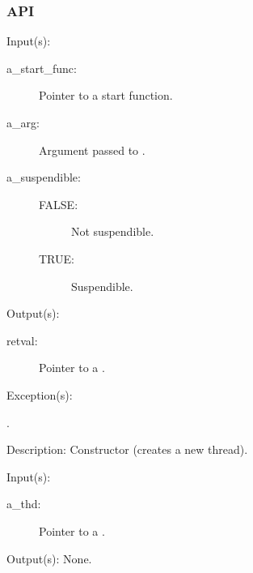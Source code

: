 \subsubsection{API}
\begin{capi}
\label{thd_new}
	\begin{capilist}
	\item[Input(s): ]
		\begin{description}\item[]
		\item[a\_start\_func: ] Pointer to a start function.
		\item[a\_arg: ] Argument passed to .
		\item[a\_suspendible: ]
		\begin{description}\item[]
			\item[FALSE: ] Not suspendible.
			\item[TRUE: ] Suspendible.
		\end{description}
		\end{description}
	\item[Output(s): ]
		\begin{description}\item[]
		\item[retval: ] Pointer to a .
		\end{description}
	\item[Exception(s): ]
		\begin{description}\item[]
		\item[.]
		\end{description}
	\item[Description: ]
		Constructor (creates a new thread).
	\end{capilist}
\label{thd_delete}
	\begin{capilist}
	\item[Input(s): ]
		\begin{description}\item[]
		\item[a\_thd: ] Pointer to a \classname{thd}.
		\end{description}
	\item[Output(s): ] None.

\end{capilist}
\end{capi}
